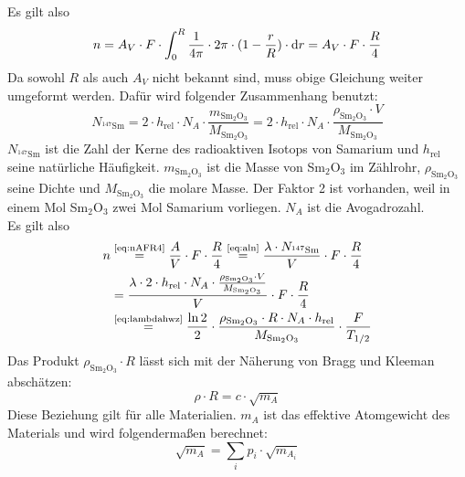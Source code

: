 Es gilt also
\begin{equation}
\label{eq:nAFR4}
  n=A_V \cdot F \cdot \int_{0}^{R}{\frac{1}{4\pi}\cdot 2\pi \cdot (1-\frac{r}{R}) \cdot \mathrm{d} r}=
  A_V \cdot F \cdot \frac{R}{4}
\end{equation}
Da sowohl $R$ als auch $A_V$ nicht bekannt sind, muss obige Gleichung weiter umgeformt werden.
Dafür wird folgender Zusammenhang benutzt:
\begin{equation}
  N_{{}^{147}\text{Sm}}=
  2 \cdot h_{\text{rel}} \cdot N_A \cdot \frac{m_{\text{Sm}_2\text{O}_3}}{M_{\text{Sm}_2\text{O}_3}}=
  2 \cdot h_{\text{rel}} \cdot N_A \cdot \frac{\rho_{\text{Sm}_2\text{O}_3} \cdot V}{M_{\text{Sm}_2\text{O}_3}}
\end{equation}
$  N_{{}^{147}\text{Sm}}$ ist die Zahl der Kerne des radioaktiven Isotops von Samarium und
$h_{\text{rel}}$ seine natürliche Häufigkeit. $m_{\text{Sm}_2\text{O}_3}$ ist die Masse von Sm$_2$O$_3$ im Zählrohr,
$\rho_{\text{Sm}_2\text{O}_3}$ seine Dichte und $M_{\text{Sm}_2\text{O}_3}$ die molare Masse.
Der Faktor 2 ist vorhanden, weil in einem Mol Sm$_2$O$_3$ zwei Mol Samarium vorliegen.
$N_A$ ist die Avogadrozahl.\\
Es gilt also
\begin{equation}
\label{eq:samarium:halflife}
\begin{split}
  n & \refeq{eq:nAFR4}
  \frac{A}{V} \cdot F \cdot \frac{R}{4} \refeq{eq:aln} \frac{\lambda \cdot N_{{}^{147}\text{Sm}}}{V} \cdot F \cdot \frac{R}{4} \\
  &= \frac{\lambda \cdot 2 \cdot h_{\text{rel}} \cdot N_A \cdot
  \frac{\rho_{\text{Sm}_2\text{O}_3} \cdot V}{M_{\text{Sm}_2\text{O}_3}}}{V} \cdot F \cdot \frac{R}{4} \\
  & \refeq{eq:lambdahwz} \frac{\ln 2}{2} \cdot \frac{\rho_{\text{Sm}_2\text{O}_3} \cdot R \cdot N_A \cdot h_{\text{rel}}}{M_{\text{Sm}_2\text{O}_3}} 
  \cdot \frac{F}{T_{1/2}}
  \end{split}
\end{equation}
Das Produkt $\rho_{\text{Sm}_2\text{O}_3} \cdot R$ lässt sich mit der Näherung von Bragg und Kleeman abschätzen:
\begin{equation}
  \rho \cdot R = c \cdot \sqrt{m_A}
\end{equation}
Diese Beziehung gilt für alle Materialien. $m_A$ ist das effektive Atomgewicht des Materials
und wird folgendermaßen berechnet:
\begin{equation}
  \sqrt{m_A} = \sum_{i}p_i \cdot \sqrt{m_{A_i}}
\end{equation}
